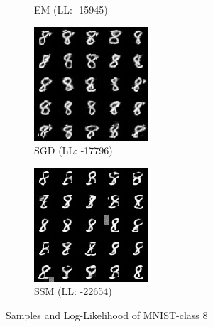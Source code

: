 \begin{figure}[H]
\begin{subfigure}[b]{0.24\textwidth}
        \caption{EM (LL: -15945)}
    \end{subfigure}
    \begin{subfigure}[b]{0.24\textwidth}
        \centering
        \includegraphics[width=\textwidth]{figures/einsum/mnist/[8]_SGD.png} 
        \caption{SGD (LL: -17796)}
    \end{subfigure}
    \begin{subfigure}[b]{0.24\textwidth}
        \centering
        \includegraphics[width=\textwidth]{figures/einsum/mnist/[8]_SSM.png}
        \caption{SSM (LL: -22654)}
    \end{subfigure}
    \caption{Samples and Log-Likelihood of MNIST-class 8}
\end{figure}

